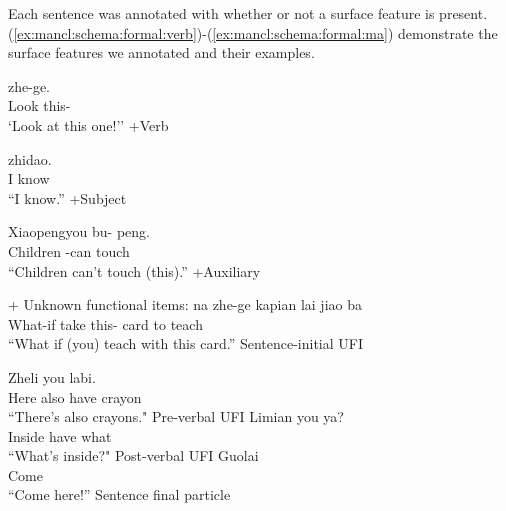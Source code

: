 Each sentence was annotated with whether or not a surface feature is present. (\ref{ex:mancl:schema:formal:verb})-(\ref{ex:mancl:schema:formal:ma}) demonstrate the surface features we annotated and their examples.  


\begin{exe} \label{ex:mancl:schema:formal:verb}
\ex 
\gll {} zhe-ge.\\
Look this-\Cl{}\\
\trans `Look at this one!'' \hfill +Verb
\end{exe}

\gll {} zhidao.\\
I know\\
\trans ``I know.'' \hfill +Subject
\eex

\bxl
\gll Xiaopengyou bu- peng.\\
Children \Neg-can touch\\
\trans ``Children can't touch (this).'' \hfill +Auxiliary
\exl
\eex

+ Unknown functional items:
\bxl
\gll {} na zhe-ge kapian lai jiao ba\\
What-if take this-\Cl{} card to teach \Sfp{}\\
\trans ``What if (you) teach with this card.''  \hfill Sentence-initial UFI

\ex
\gll Zheli  you labi.\\
Here also have crayon\\
\trans ``There's also crayons." \hfill Pre-verbal UFI
\ex
\gll  Limian you  ya?\\
Inside have what \Sfp{}\\
\trans ``What's inside?" \hfill Post-verbal UFI
\ex 
\gll Guolai \\
Come \Sfp{}\\
\trans ``Come here!'' \hfill Sentence final particle
\exl
\eex

